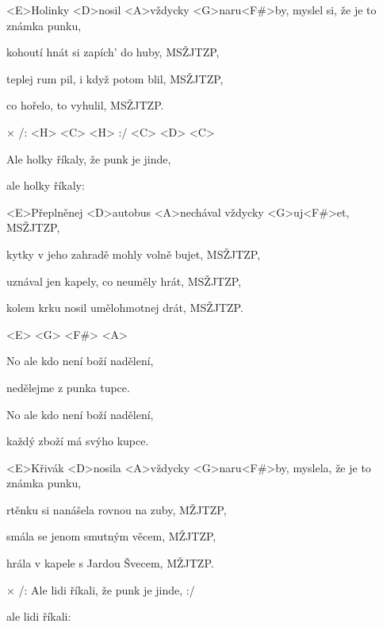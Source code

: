 

\zs
<E>Holinky <D>nosil <A>vždycky <G>naru<F#>by, myslel si, že je to známka punku,

kohoutí hnát si zapích' do huby, MSŽJTZP,

teplej rum pil, i když potom blil, MSŽJTZP,

co hořelo, to vyhulil, MSŽJTZP.
\ks

× /: <H> <C> <H> :/ <C> <D> <C>

Ale holky říkaly,
že punk je jinde,

ale holky říkaly:
\kr

\zs
<E>Přeplněnej <D>autobus <A>nechával vždycky <G>uj<F#>et, MSŽJTZP,

kytky v jeho zahradě mohly volně bujet, MSŽJTZP,

uznával jen kapely, co neuměly hrát, MSŽJTZP,

kolem krku nosil umělohmotnej drát, MSŽJTZP.
\ks

\zr \kr

\zs
<E> <G> <F#> <A>

No ale kdo není boží nadělení,

nedělejme z punka tupce.

No ale kdo není boží nadělení,

každý zboží má svýho kupce.
\ks

\zs
<E>Křivák <D>nosila <A>vždycky <G>naru<F#>by,
myslela, že je to známka punku,

rtěnku si nanášela rovnou na zuby, MŽJTZP,

smála se jenom smutným věcem, MŽJTZP,

hrála v kapele s Jardou Švecem, MŽJTZP.
\ks

× /: Ale lidi říkali,
že punk je jinde, :/

ale lidi říkali:
\kr

\kp






















